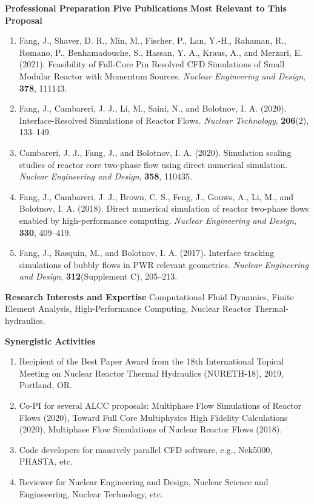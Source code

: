 \documentclass[11pt,letterpaper,english]{article}
\begin{document}
\begin{flushleft} {\bf Professional Preparation}
\vspace{.04in}
{\bf Five Publications Most Relevant to This Proposal}
\vspace{-6pt}
\begin{enumerate} \itemsep1pt \parskip0pt 
\item Fang, J., Shaver, D. R., Min, M., Fischer, P., Lan, Y.-H., Rahaman, R., Romano, P., Benhamadouche, S., Hassan, Y. A., Kraus, A., and Merzari, E. (2021). Feasibility of Full-Core Pin Resolved CFD Simulations of Small Modular Reactor with Momentum Sources. \textit{Nuclear Engineering and Design}, {\bf 378}, 111143.
\item Fang, J., Cambareri, J. J., Li, M., Saini, N., and Bolotnov, I. A. (2020). Interface-Resolved Simulations of Reactor Flows. \textit{Nuclear Technology}, {\bf 206}(2), 133–149. 
\item Cambareri, J. J., Fang, J., and Bolotnov, I. A. (2020). Simulation scaling studies of reactor core two-phase flow using direct numerical simulation. \textit{Nuclear Engineering and Design}, {\bf 358}, 110435. 
\item Fang, J., Cambareri, J. J., Brown, C. S., Feng, J., Gouws, A., Li, M., and Bolotnov, I. A. (2018). Direct numerical simulation of reactor two-phase flows enabled by high-performance computing. \textit{Nuclear Engineering and Design}, {\bf 330}, 409–419.
\item Fang, J., Rasquin, M., and Bolotnov, I. A. (2017). Interface tracking simulations of bubbly flows in PWR relevant geometries. \textit{Nuclear Engineering and Design}, {\bf 312}(Supplement C), 205–213. 
\end{enumerate}

\vspace{-6pt}
{\bf Research Interests and Expertise}
{\parindent 16pt
Computational Fluid Dynamics, Finite Element Analysis, High-Performance Computing, Nuclear Reactor Thermal-hydraulics.
}

\vspace{.04in}
{\bf Synergistic Activities}
\vspace{-6pt}
\begin{enumerate} \itemsep1pt \parskip0pt 
\item Recipient of the Best Paper Award from the 18th International Topical Meeting on Nuclear Reactor Thermal Hydraulics (NURETH-18), 2019, Portland, OR.
\item Co-PI for several ALCC proposals: Multiphase Flow Simulations of Reactor Flows (2020), Toward Full Core Multiphysics High Fidelity Calculations (2020), Multiphase Flow Simulations of Nuclear Reactor Flows (2018).
\item Code developers for massively parallel CFD software, e.g., Nek5000, PHASTA, etc.  
\item Reviewer for Nuclear Engineering and Design, Nuclear Science and Engineeering, Nuclear Technology, etc.
\end{enumerate}


\end{flushleft}
\end{document}
